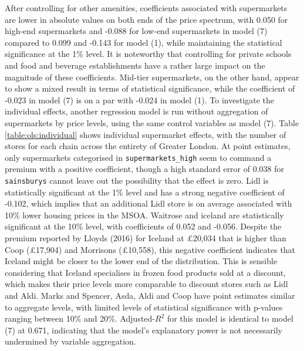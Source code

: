 \documentclass{article}
\begin{document}
After controlling for other amenities, coefficients associated with supermarkets are lower in absolute values on both ends of the price spectrum, with 0.050 for high-end supermarkets and -0.088 for low-end supermarkets in model (7) compared to 0.099 and -0.143 for model (1), while maintaining the statistical significance at the 1\% level. It is noteworthy that controlling for private schools and food and beverage establishments have a rather large impact on the magnitude of these coefficients. Mid-tier supermarkets, on the other hand, appear to show a mixed result in terms of statistical significance, while the coefficient of -0.023 in model (7) is on a par with -0.024 in model (1). To investigate the individual effects, another regression model is run without aggregation of supermarkets by price levels, using the same control variables as model (7). Table \ref{table:ols:individual} shows individual supermarket effects, with the number of stores for each chain across the entirety of Greater London. At point estimates, only supermarkets categorised in \texttt{supermarkets\_high} seem to command a premium with a positive coefficient, though a high standard error of 0.038 for \texttt{sainsburys} cannot leave out the possibility that the effect is zero. Lidl is statistically significant at the 1\% level and has a strong negative coefficient of -0.102, which implies that an additional Lidl store is on average associated with 10\% lower housing prices in the MSOA. Waitrose and iceland are statistically significant at the 10\% level, with coefficients of 0.052 and -0.056. Despite the premium reported by Lloyds (2016) for Iceland at £20,034 that is higher than Coop (£17,904) and Morrisons (£10,558), this negative coefficient indicates that Iceland might be closer to the lower end of the distribution. This is sensible considering that Iceland specialises in frozen food products sold at a discount, which makes their price levels more comparable to discount stores such as Lidl and Aldi. Marks and Spencer, Asda, Aldi and Coop have point estimates similar to aggregate levels, with limited levels of statistical significance with p-values ranging between 10\% and 20\%. Adjusted-$R^2$ for this model is identical to model (7) at 0.671, indicating that the model's explanatory power is not necessarily undermined by variable aggregation. 
\end{document}
